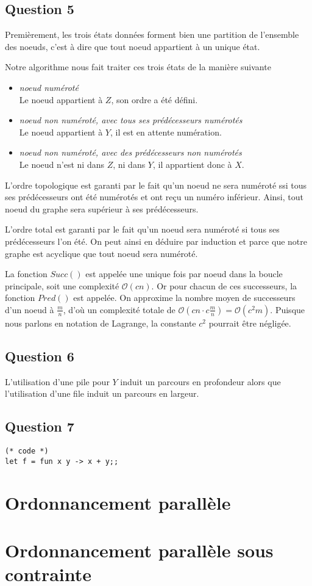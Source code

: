 \documentclass[11pt]{article}
\begin{document}
  \subsection{Question 5}
    Premièrement, les trois états données forment bien une partition de
    l'ensemble des noeuds, c'est à dire que tout noeud appartient à un unique
    état.

    Notre algorithme nous fait traiter ces trois états de la manière suivante
    \begin{itemize}
      \item \emph{noeud numéroté} \\
        Le noeud appartient à $Z$, son ordre a été défini.
      \item \emph{noeud non numéroté, avec tous ses prédécesseurs numérotés} \\
        Le noeud appartient à $Y$, il est en attente numération.
      \item \emph{noeud non numéroté, avec des prédécesseurs non numérotés} \\
        Le noeud n'est ni dans $Z$, ni dans $Y$, il appartient donc à $X$.
    \end{itemize}

    L'ordre topologique est garanti par le fait qu'un noeud ne sera numéroté ssi
    tous ses prédécesseurs ont été numérotés et ont reçu un numéro inférieur.
    Ainsi, tout noeud du graphe sera supérieur à ses prédécesseurs.

    L'ordre total est garanti par le fait qu'un noeud sera numéroté si tous ses
    prédécesseurs l'on été. On peut ainsi en déduire par induction et parce que
    notre graphe est acyclique que tout noeud sera numéroté.

    La fonction $Succ()$ est appelée une unique fois par noeud dans la boucle
    principale, soit une complexité $\mathcal{O}(c n)$. Or pour chacun de ces
    successeurs, la fonction $Pred()$ est appelée. On approxime la nombre moyen
    de successeurs d'un noeud à $\frac{m}{n}$, d'où un complexité totale de
    $\mathcal{O}(c n \cdot c \frac{m}{n}) = \mathcal{O}(c^2 m)$. Puisque nous
    parlons en notation de Lagrange, la constante $c^2$ pourrait être négligée.

  \subsection{Question 6}
    L'utilisation d'une pile pour $Y$ induit un parcours en profondeur alors que
    l'utilisation d'une file induit un parcours en largeur.

  \subsection{Question 7}
    \begin{verbatim}
(* code *)
let f = fun x y -> x + y;;
    \end{verbatim}
\section{Ordonnancement parallèle}
\section{Ordonnancement parallèle sous contrainte}
\end{document}
